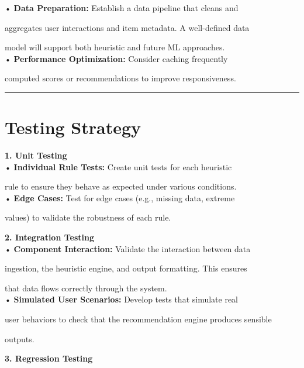 \documentclass[11pt]{article}
\begin{document}
• \textbf{Data Preparation:} Establish a data pipeline that cleans and

aggregates user interactions and item metadata. A well-defined data

model will support both heuristic and future ML approaches.\\

• \textbf{Performance Optimization:} Consider caching frequently

computed scores or recommendations to improve responsiveness.



\begin{center}\rule{0.5\linewidth}{0.5pt}\end{center}



\section{Testing Strategy}\label{testing-strategy}



\textbf{1. Unit Testing}\\

• \textbf{Individual Rule Tests:} Create unit tests for each heuristic

rule to ensure they behave as expected under various conditions.\\

• \textbf{Edge Cases:} Test for edge cases (e.g., missing data, extreme

values) to validate the robustness of each rule.



\textbf{2. Integration Testing}\\

• \textbf{Component Interaction:} Validate the interaction between data

ingestion, the heuristic engine, and output formatting. This ensures

that data flows correctly through the system.\\

• \textbf{Simulated User Scenarios:} Develop tests that simulate real

user behaviors to check that the recommendation engine produces sensible

outputs.



\textbf{3. Regression Testing}\\
\end{document}
